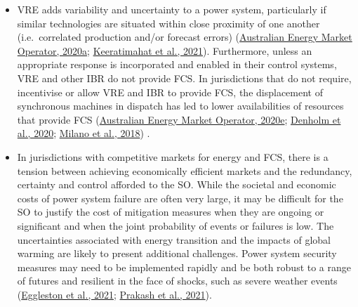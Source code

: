 \documentclass[12pt,a4paper,]{report}
\begin{document}
\begin{itemize}
\item
  VRE adds variability and uncertainty to a power system, particularly
  if similar technologies are situated within close proximity of one
  another (i.e.~correlated production and/or forecast errors)
  (\protect\hyperlink{ref-australianenergymarketoperatorRenewableIntegrationStudy2020}{Australian
  Energy Market Operator, 2020a};
  \protect\hyperlink{ref-keeratimahatAnalysisShorttermOperational2021}{Keeratimahat
  et al., 2021}). Furthermore, unless an appropriate response is
  incorporated and enabled in their control systems, VRE and other IBR
  do not provide FCS. In jurisdictions that do not require, incentivise
  or allow VRE and IBR to provide FCS, the displacement of synchronous
  machines in dispatch has led to lower availabilities of resources that
  provide FCS
  (\protect\hyperlink{ref-australianenergymarketoperatorRenewableIntegrationStudy2020c}{Australian
  Energy Market Operator, 2020e};
  \protect\hyperlink{ref-denholmInertiaPowerGrid2020}{Denholm et al.,
  2020};
  \protect\hyperlink{ref-milanoFoundationsChallengesLowInertia2018}{Milano
  et al., 2018}) .
\item
  In jurisdictions with competitive markets for energy and FCS, there is
  a tension between achieving economically efficient markets and the
  redundancy, certainty and control afforded to the SO. While the
  societal and economic costs of power system failure are often very
  large, it may be difficult for the SO to justify the cost of
  mitigation measures when they are ongoing or significant and when the
  joint probability of events or failures is low. The uncertainties
  associated with energy transition and the impacts of global warming
  are likely to present additional challenges. Power system security
  measures may need to be implemented rapidly and be both robust to a
  range of futures and resilient in the face of shocks, such as severe
  weather events
  (\protect\hyperlink{ref-egglestonSecurityResilienceTechnical2021}{Eggleston
  et al., 2021};
  \protect\hyperlink{ref-prakashResponseFrequencyControl2021}{Prakash et
  al., 2021}).
\end{itemize}
\end{document}
